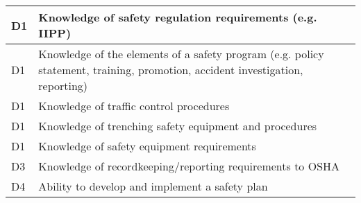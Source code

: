 \begin{table}[H]
\begin{tabular}{| m{1cm} | m{15cm} |}
D1 & Knowledge of safety   regulation requirements (e.g. IIPP)                                                                         \\ \hline
D1 & Knowledge of the   elements of a safety program (e.g. policy statement, training, promotion,   accident investigation, reporting) \\ \hline
D1 & Knowledge of traffic   control procedures                                                                                         \\ \hline
D1 & Knowledge of   trenching safety equipment and procedures                                                                          \\ \hline
D1 & Knowledge of safety   equipment requirements                                                                                      \\ \hline
D3 & Knowledge of   recordkeeping/reporting requirements to OSHA                                                                       \\ \hline
D4 & Ability to develop and implement a safety   plan                                                                                  \\ \hline
\end{tabular}
\end{table}

\newpage



